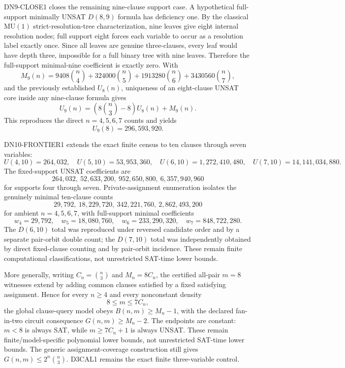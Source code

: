 \documentclass[11pt]{article}
\begin{document}
DN9-CLOSE1 closes the remaining nine-clause support case. A hypothetical full-support
minimally UNSAT \(D(8,9)\) formula has deficiency one. By the classical
\(\mathrm{MU}(1)\) strict-resolution-tree characterization, nine leaves give eight
internal resolution nodes; full support eight forces each variable to occur as a resolution
label exactly once. Since all leaves are genuine three-clauses, every leaf would have depth
three, impossible for a full binary tree with nine leaves. Therefore the full-support
minimal-nine coefficient is exactly zero. With
\[
M_9(n)=9408\binom n4+324000\binom n5+
1913280\binom n6+3430560\binom n7,
\]
and the previously established \(U_8(n)\), uniqueness of an eight-clause UNSAT core
inside any nine-clause formula gives
\[
U_9(n)=\left(8\binom n3-8\right)U_8(n)+M_9(n).
\]
This reproduces the direct \(n=4,5,6,7\) counts and yields
\[
U_9(8)=296{,}593{,}920.
\]

DN10-FRONTIER1 extends the exact finite census to ten clauses through seven variables:
\[
U(4,10)=264{,}032,\quad
U(5,10)=53{,}953{,}360,\quad
U(6,10)=1{,}272{,}410{,}480,\quad
U(7,10)=14{,}141{,}034{,}880.
\]
The fixed-support UNSAT coefficients are
\[
264{,}032,\ 52{,}633{,}200,\ 952{,}650{,}800,\ 6{,}357{,}940{,}960
\]
for supports four through seven. Private-assignment enumeration isolates the genuinely
minimal ten-clause counts
\[
29{,}792,\ 18{,}229{,}720,\ 342{,}221{,}760,\ 2{,}862{,}493{,}200
\]
for ambient \(n=4,5,6,7\), with full-support minimal coefficients
\[
w_4=29{,}792,\quad w_5=18{,}080{,}760,\quad
w_6=233{,}290{,}320,\quad w_7=848{,}722{,}280.
\]
The \(D(6,10)\) total was reproduced under reversed candidate order and by a separate
pair-orbit double count; the \(D(7,10)\) total was independently obtained by direct
fixed-clause counting and by pair-orbit incidence. These remain finite computational
classifications, not unrestricted SAT-time lower bounds.

More generally, writing \(C_n=\binom n3\) and \(M_n=8C_n\), the certified all-pair
\(m=8\) witnesses extend by adding common clauses satisfied by a fixed satisfying
assignment. Hence for every \(n\ge4\) and every nonconstant density
\[
8\le m\le7C_n,
\]
the global clause-query model obeys \(B(n,m)\ge M_n-1\), with the declared fan-in-two
circuit consequence \(G(n,m)\ge M_n-2\). The endpoints are constant: \(m<8\) is
always SAT, while \(m\ge7C_n+1\) is always UNSAT. These remain finite/model-specific
polynomial lower bounds, not unrestricted SAT-time lower bounds. The generic
assignment-coverage construction still gives \(G(n,m)\le2^n\binom n3\). D3CAL1
remains the exact finite three-variable control.
\end{document}
